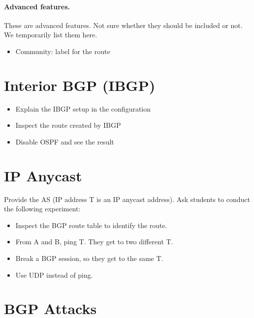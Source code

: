 \paragraph{Advanced features.} 
These are advanced features. Not sure whether they should be included or not.
We temporarily list them here.

\begin{itemize}
  \item Community: label for the route
\end{itemize}
 


\section{Interior BGP (IBGP)} 


\begin{itemize}
  \item Explain the IBGP setup in the configuration 
  \item Inspect the route created by IBGP
  \item Disable OSPF and see the result
\end{itemize}
 


\section{IP Anycast} 

Provide the AS (IP address T is an IP anycast address). 
Ask students to conduct the following experiment:

\begin{itemize}
  \item Inspect the BGP route table to identify the route.
  \item From A and B, ping T. They get to two different T.
  \item Break a BGP session, so they get to the same T.
  \item Use UDP instead of ping.
\end{itemize}
 


\section{BGP Attacks} 


